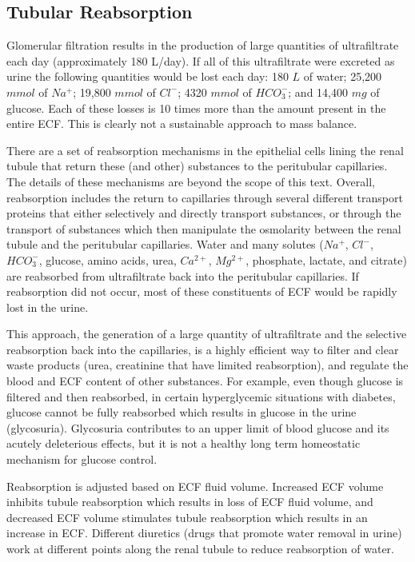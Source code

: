 \subsection{Tubular Reabsorption}

Glomerular filtration results in the production of large quantities of ultrafiltrate each day (approximately  180 L/day). If all of this ultrafiltrate were excreted as urine the following quantities would be lost each day: 180 $L$ of water; 25,200 $mmol$ of $Na^+$; 19,800 $mmol$ of $Cl^-$; 4320 $mmol$ of $HCO_{3}^{-}$; and 14,400 $mg$ of glucose. Each of these losses is 10 times more than the amount present in the entire ECF. This is clearly not a sustainable approach to mass balance. 

There are a set of reabsorption mechanisms in the epithelial cells lining the renal tubule that return these (and other) substances to the peritubular capillaries. The details of these mechanisms are beyond the scope of this text. Overall, reabsorption includes the return to capillaries through several different transport proteins that either selectively and directly transport substances, or through the transport of substances which then manipulate the osmolarity between the renal tubule and the peritubular capillaries.  Water and many solutes ($Na^+$, $Cl^-$, $HCO_3^-$, glucose, amino acids, urea, $Ca^{2+}$, $Mg^{2+}$, phosphate, lactate, and citrate) are reabsorbed from ultrafiltrate back into the peritubular capillaries. If reabsorption did not occur, most of these constituents of ECF would be rapidly lost in the urine.

This approach, the generation of a large quantity of ultrafiltrate and the selective reabsorption back into the capillaries, is a highly efficient way to filter and clear waste products (urea, creatinine that have limited reabsorption), and regulate the blood and ECF content of other substances. For example, even though glucose is filtered and then reabsorbed, in certain hyperglycemic situations with diabetes, glucose cannot be fully reabsorbed which results in glucose in the urine (glycosuria).  Glycosuria contributes to an upper limit of blood glucose and its acutely deleterious effects, but it is not a healthy long term homeostatic mechanism for glucose control. 

Reabsorption is adjusted based on ECF fluid volume. Increased ECF volume inhibits tubule reabsorption which results in loss of ECF fluid volume, and decreased ECF volume stimulates tubule reabsorption which results in an increase in ECF. Different diuretics (drugs that promote water removal in urine) work at different points along the renal tubule to reduce reabsorption of water.


